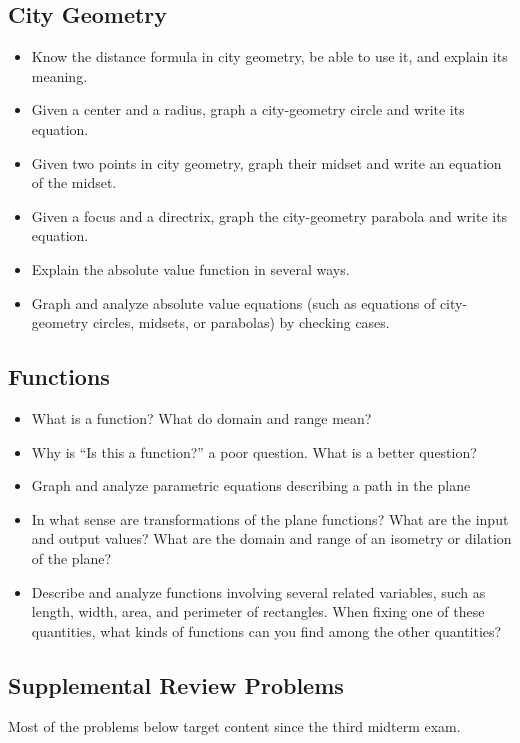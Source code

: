 \subsection*{City Geometry}
\begin{itemize}\itemsep-3pt
\item Know the distance formula in city geometry, be able to use it, and explain its meaning. 
\item Given a center and a radius, graph a city-geometry circle and write its equation.  
\item Given two points in city geometry,  graph their midset and write an equation of the midset.  
\item Given a focus and a directrix, graph the city-geometry parabola and write its equation.  
\item Explain the absolute value function in several ways.
\item Graph and analyze absolute value equations (such as equations of city-geometry circles, midsets, or parabolas) by checking cases.  
\end{itemize}

\subsection*{Functions}
\begin{itemize}\itemsep-3pt
\item What is a function?  What do domain and range mean?  
\item Why is ``Is this a function?'' a poor question.  What is a better question?  
\item Graph and analyze parametric equations describing a path in the plane
\item In what sense are transformations of the plane functions?  What are the input and output values?  What are the domain and range of an isometry or dilation of the plane?  
\item Describe and analyze functions involving several related variables, such as length, width, area, and perimeter of rectangles.   When fixing one of these quantities, what kinds of functions can you find among the other quantities? 
\end{itemize}



\subsection{Supplemental Review Problems}
Most of the problems below target content since the third midterm exam. 

